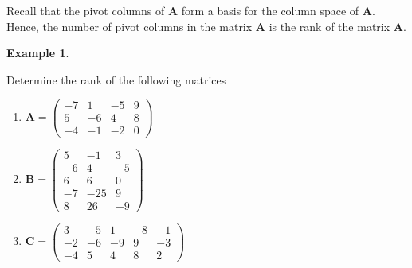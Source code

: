 \documentclass[
]{book}
\theoremstyle{definition}
\theoremstyle{definition}
\newtheorem{example}{Example}[chapter]
\theoremstyle{definition}
\theoremstyle{remark}
\begin{document}
Recall that the pivot columns of \(\mathbf{A}\) form a basis for the column space of \(\mathbf{A}\). Hence, the number of pivot columns in the matrix \(\mathbf{A}\) is the rank of the matrix \(\mathbf{A}\).

\begin{example}
\protect\hypertarget{exm:unlabeled-div-98}{}\label{exm:unlabeled-div-98}

Determine the rank of the following matrices

\begin{enumerate}
\def\labelenumi{\arabic{enumi})}
\item
  \(\mathbf{A} = \begin{pmatrix} -7 & 1 & -5 & 9 \\ 5 & -6 & 4 & 8 \\ -4 & -1 & -2 & 0 \end{pmatrix}\)
\item
  \(\mathbf{B} = \begin{pmatrix} 5 & -1 & 3 \\ -6 & 4 & -5 \\ 6 & 6 & 0 \\ -7 & -25 & 9 \\ 8 & 26 & -9 \end{pmatrix}\)
\item
  \(\mathbf{C} = \begin{pmatrix} 3 & -5 & 1 & -8 & -1 \\ -2 & -6 & -9 & 9 & -3 \\ -4 & 5 & 4 & 8 & 2 \end{pmatrix}\)
\end{enumerate}

\end{example}
\end{document}
